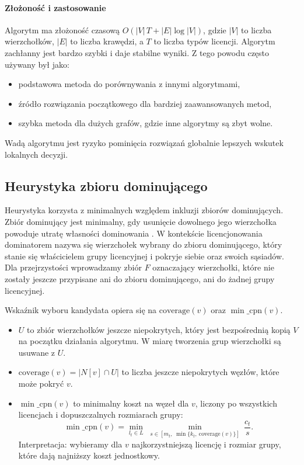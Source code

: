 \paragraph{Złożoność i zastosowanie}
Algorytm ma złożoność czasową $O(|V|\,T + |E|\log |V|)$, gdzie $|V|$ to liczba wierzchołków, $|E|$ to liczba krawędzi, a $T$ to liczba typów licencji.
Algorytm zachłanny jest bardzo szybki i daje stabilne wyniki. Z tego powodu często używany był jako:
\begin{itemize}
  \item podstawowa metoda do porównywania z innymi algorytmami,
  \item źródło rozwiązania początkowego dla bardziej zaawansowanych metod,
  \item szybka metoda dla dużych grafów, gdzie inne algorytmy są zbyt wolne.
\end{itemize}
Wadą algorytmu jest ryzyko pominięcia rozwiązań globalnie lepszych wskutek lokalnych decyzji.
\subsection{Heurystyka zbioru dominującego}\label{subsec:ds}

Heurystyka korzysta z minimalnych względem inkluzji zbiorów dominujących. Zbiór dominujący jest minimalny, gdy usunięcie dowolnego jego wierzchołka powoduje utratę własności dominowania \cite{haynes1998domination}. W kontekście licencjonowania dominatorem nazywa się wierzchołek wybrany do zbioru dominującego, który stanie się właścicielem grupy licencyjnej i pokryje siebie oraz swoich sąsiadów. Dla przejrzystości wprowadzamy zbiór $F$ oznaczający wierzchołki, które nie zostały jeszcze przypisane ani do zbioru dominującego, ani do żadnej grupy licencyjnej.

Wskaźnik wyboru kandydata opiera się na \(\mathrm{coverage}(v)\) oraz \(\min\_\mathrm{cpn}(v)\).
\begin{itemize}
  \item $U$ to zbiór wierzchołków jeszcze niepokrytych, który jest bezpośrednią kopią $V$ na początku działania algorytmu. W miarę tworzenia grup wierzchołki są usuwane z $U$.
  \item \(\mathrm{coverage}(v)=|N[v]\cap U|\) to liczba jeszcze niepokrytych węzłów, które może pokryć \(v\).
  \item \(\min\_\mathrm{cpn}(v)\) to minimalny koszt na węzeł dla \(v\), liczony po wszystkich licencjach i dopuszczalnych rozmiarach grupy:
        \[
          \min\_\mathrm{cpn}(v)=\min_{l_t\in L}\;\min_{s\in[m_t,\;\min\{k_t,\ \mathrm{coverage}(v)\}]}\ \frac{c_t}{s}.
        \]
        Interpretacja: wybieramy dla \(v\) najkorzystniejszą licencję i rozmiar grupy, które dają najniższy koszt jednostkowy.
\end{itemize}

